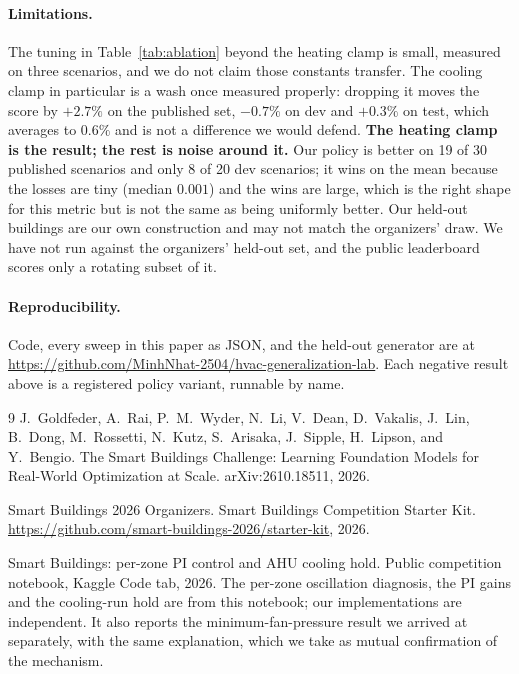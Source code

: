 \documentclass[10pt]{article}
\begin{document}
\paragraph{Limitations.} The tuning in Table~\ref{tab:ablation} beyond the
heating clamp is small, measured on three scenarios, and we do not claim those
constants transfer. The cooling clamp in particular is a wash once measured
properly: dropping it moves the score by $+2.7\%$ on the published set,
$-0.7\%$ on dev and $+0.3\%$ on test, which averages to $0.6\%$ and is not a
difference we would defend. \textbf{The heating clamp is the result; the rest
is noise around it.} Our policy is better on 19 of 30 published scenarios and only 8 of
20 dev scenarios; it wins on the mean because the losses are tiny (median
$0.001$) and the wins are large, which is the right shape for this metric but
is not the same as being uniformly better. Our held-out buildings are our own
construction and may not match the organizers' draw. We have not run against
the organizers' held-out set, and the public leaderboard scores only a
rotating subset of it.

\paragraph{Reproducibility.} Code, every sweep in this paper as JSON, and the
held-out generator are at
\url{https://github.com/MinhNhat-2504/hvac-generalization-lab}. Each negative
result above is a registered policy variant, runnable by name.

\begin{thebibliography}{9}
J.~Goldfeder, A.~Rai, P.~M.~Wyder, N.~Li, V.~Dean, D.~Vakalis, J.~Lin, B.~Dong,
M.~Rossetti, N.~Kutz, S.~Arisaka, J.~Sipple, H.~Lipson, and Y.~Bengio.
\newblock The Smart Buildings Challenge: Learning Foundation Models for
Real-World Optimization at Scale.
\newblock arXiv:2610.18511, 2026.

Smart Buildings 2026 Organizers.
\newblock Smart Buildings Competition Starter Kit.
\newblock \url{https://github.com/smart-buildings-2026/starter-kit}, 2026.

Smart Buildings: per-zone PI control and AHU cooling hold.
\newblock Public competition notebook, Kaggle Code tab, 2026.
\newblock The per-zone oscillation diagnosis, the PI gains and the cooling-run
hold are from this notebook; our implementations are independent. It also
reports the minimum-fan-pressure result we arrived at separately, with the
same explanation, which we take as mutual confirmation of the mechanism.
\end{thebibliography}
\end{document}
